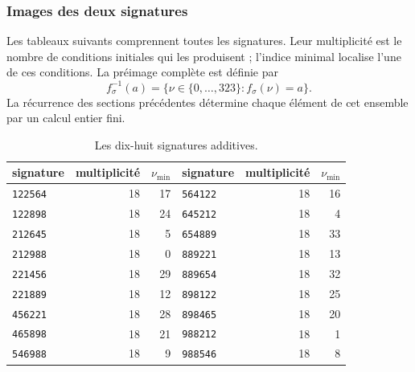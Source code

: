 \par\noindent\begin{minipage}{\linewidth}
\subsubsection{Images des deux signatures}

Les tableaux suivants comprennent toutes les signatures. Leur multiplicité est le
nombre de conditions initiales qui les produisent ; l'indice minimal localise
l'une de ces conditions. La préimage complète est définie par
\[
 f_\sigma^{-1}(a)=\{\nu\in\{0,\ldots,323\}:f_\sigma(\nu)=a\}.
\]
La récurrence des sections précédentes détermine chaque élément de cet
ensemble par un calcul entier fini.

\begin{table}[H]
\centering\fontsize{9.5}{11.4}\selectfont
\setlength{\abovecaptionskip}{8pt}\setlength{\belowcaptionskip}{6pt}
\renewcommand{\arraystretch}{1.12}
\caption{Les dix-huit signatures additives.}
\label{act21:tpk:firmas-aditivas}
\begin{tabular}{@{}lrr@{\qquad}lrr@{}}
\toprule
signature&multiplicité&\(\nu_{\min}\)&signature&multiplicité&\(\nu_{\min}\)\\
\midrule
\texttt{122564}&18&17&\texttt{564122}&18&16\\
\texttt{122898}&18&24&\texttt{645212}&18&4\\
\texttt{212645}&18&5&\texttt{654889}&18&33\\
\texttt{212988}&18&0&\texttt{889221}&18&13\\
\texttt{221456}&18&29&\texttt{889654}&18&32\\
\texttt{221889}&18&12&\texttt{898122}&18&25\\
\texttt{456221}&18&28&\texttt{898465}&18&20\\
\texttt{465898}&18&21&\texttt{988212}&18&1\\
\texttt{546988}&18&9&\texttt{988546}&18&8\\
\bottomrule
\end{tabular}

\par\vspace{12pt}


\end{table}
\end{minipage}
